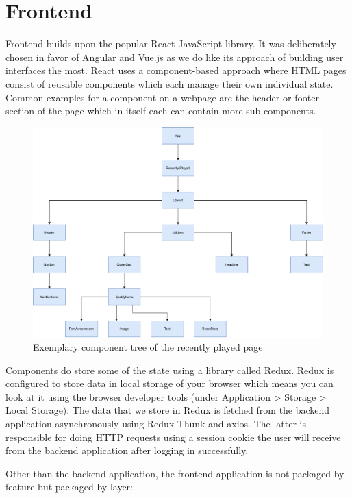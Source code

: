 \section{Frontend}

Frontend builds upon the popular React JavaScript library. It was deliberately chosen in favor of Angular and Vue.js as we do like its approach of building user interfaces the most. React uses a component-based approach where \acs{HTML} pages consist of reusable components which each manage their own individual state. Common examples for a component on a webpage are the header or footer section of the page which in itself each can contain more sub-components.

\begin{figure}[bth]
    \centering
    \includegraphics[width=1.0\textwidth]{Graphics/Chapter3/frontend-component-tree.pdf}
    \caption{Exemplary component tree of the recently played page}
\end{figure}

Components do store some of the state using a library called Redux. Redux is configured to store data in local storage of your browser which means you can look at it using the browser developer tools (under Application > Storage > Local Storage). The data that we store in Redux is fetched from the backend application asynchronously using Redux Thunk and axios. The latter is responsible for doing \ac{HTTP} requests using a session cookie the user will receive from the backend application after logging in successfully.

Other than the backend application, the frontend application is not packaged by feature but packaged by layer:

